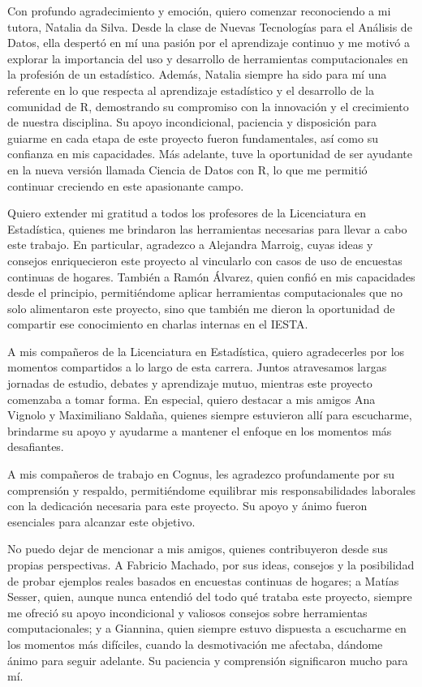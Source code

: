 Con profundo agradecimiento y emoción, quiero comenzar reconociendo a mi tutora, Natalia da Silva. Desde la clase de Nuevas Tecnologías para el Análisis de Datos, ella despertó en mí una pasión por el aprendizaje continuo y me motivó a explorar la importancia del uso y desarrollo de herramientas computacionales en la profesión de un estadístico. Además, Natalia siempre ha sido para mí una referente en lo que respecta al aprendizaje estadístico y el desarrollo de la comunidad de R, demostrando su compromiso con la innovación y el crecimiento de nuestra disciplina. Su apoyo incondicional, paciencia y disposición para guiarme en cada etapa de este proyecto fueron fundamentales, así como su confianza en mis capacidades. Más adelante, tuve la oportunidad de ser ayudante en la nueva versión llamada Ciencia de Datos con R, lo que me permitió continuar creciendo en este apasionante campo.

Quiero extender mi gratitud a todos los profesores de la Licenciatura en Estadística, quienes me brindaron las herramientas necesarias para llevar a cabo este trabajo. En particular, agradezco a Alejandra Marroig, cuyas ideas y consejos enriquecieron este proyecto al vincularlo con casos de uso de encuestas continuas de hogares. También a Ramón Álvarez, quien confió en mis capacidades desde el principio, permitiéndome aplicar herramientas computacionales que no solo alimentaron este proyecto, sino que también me dieron la oportunidad de compartir ese conocimiento en charlas internas en el IESTA.

A mis compañeros de la Licenciatura en Estadística, quiero agradecerles por los momentos compartidos a lo largo de esta carrera. Juntos atravesamos largas jornadas de estudio, debates y aprendizaje mutuo, mientras este proyecto comenzaba a tomar forma. En especial, quiero destacar a mis amigos Ana Vignolo y Maximiliano Saldaña, quienes siempre estuvieron allí para escucharme, brindarme su apoyo y ayudarme a mantener el enfoque en los momentos más desafiantes.

A mis compañeros de trabajo en Cognus, les agradezco profundamente por su comprensión y respaldo, permitiéndome equilibrar mis responsabilidades laborales con la dedicación necesaria para este proyecto. Su apoyo y ánimo fueron esenciales para alcanzar este objetivo.

No puedo dejar de mencionar a mis amigos, quienes contribuyeron desde sus propias perspectivas. A Fabricio Machado, por sus ideas, consejos y la posibilidad de probar ejemplos reales basados en encuestas continuas de hogares; a Matías Sesser, quien, aunque nunca entendió del todo qué trataba este proyecto, siempre me ofreció su apoyo incondicional y valiosos consejos sobre herramientas computacionales; y a Giannina, quien siempre estuvo dispuesta a escucharme en los momentos más difíciles, cuando la desmotivación me afectaba, dándome ánimo para seguir adelante. Su paciencia y comprensión significaron mucho para mí.

